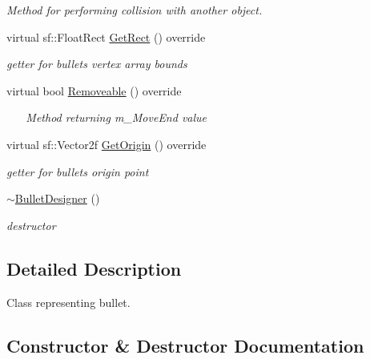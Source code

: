 \begin{DoxyCompactItemize}
\begin{DoxyCompactList}\small\item\em Method for performing collision with another object. \end{DoxyCompactList}\item 
virtual sf\+::\+Float\+Rect \mbox{\hyperlink{class_bullet_designer_ae7be5a8d1bef2c771715b5b8efce24ce}{Get\+Rect}} () override
\begin{DoxyCompactList}\small\item\em getter for bullet\textquotesingle{}s vertex array bounds \end{DoxyCompactList}\item 
virtual bool \mbox{\hyperlink{class_bullet_designer_a6287b58f72235fa91e103fa4400bdf12}{Removeable}} () override
\begin{DoxyCompactList}\small\item\em ~\newline
~\newline
Method returning m\+\_\+\+Move\+End value \end{DoxyCompactList}\item 
virtual sf\+::\+Vector2f \mbox{\hyperlink{class_bullet_designer_a89c3e817069b20e9404a01c3bdeaa481}{Get\+Origin}} () override
\begin{DoxyCompactList}\small\item\em getter for bullet\textquotesingle{}s origin point \end{DoxyCompactList}\item 
\mbox{\label{class_bullet_designer_a0155587e64e09a997c2782e185b152f8}} 
\mbox{\hyperlink{class_bullet_designer_a0155587e64e09a997c2782e185b152f8}{$\sim$\+Bullet\+Designer}} ()
\begin{DoxyCompactList}\small\item\em destructor \end{DoxyCompactList}\end{DoxyCompactItemize}


\subsection{Detailed Description}
Class representing bullet. 

\subsection{Constructor \& Destructor Documentation}
\mbox{\label{class_bullet_designer_a4712950e2c64aaea2fe446855e8ec2d2}} 
